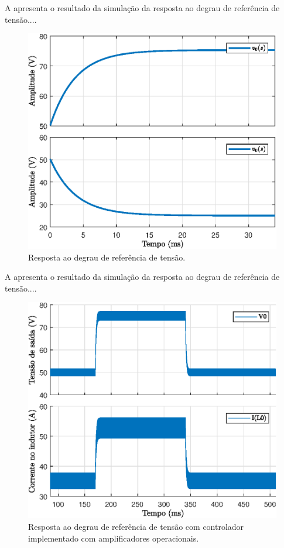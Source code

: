 A  apresenta o resultado da simulação da resposta ao degrau de referência de tensão....

\begin{figure}[!ht]
	\centering
	\includegraphics[width=0.9\linewidth]{Figs/BuckStepResponse2malhas}
	\caption{Resposta ao degrau de referência de tensão.}
	\label{fig:BuckStepResponse2malhas}
\end{figure}


A  apresenta o resultado da simulação da resposta ao degrau de referência de tensão....

\begin{figure}[!ht]
	\centering
	\includegraphics[width=0.9\linewidth]{Figs/Buck2malhas}
	\caption{Resposta ao degrau de referência de tensão com controlador implementado com amplificadores operacionais.}
	\label{fig:Buck2malhas}
\end{figure}
